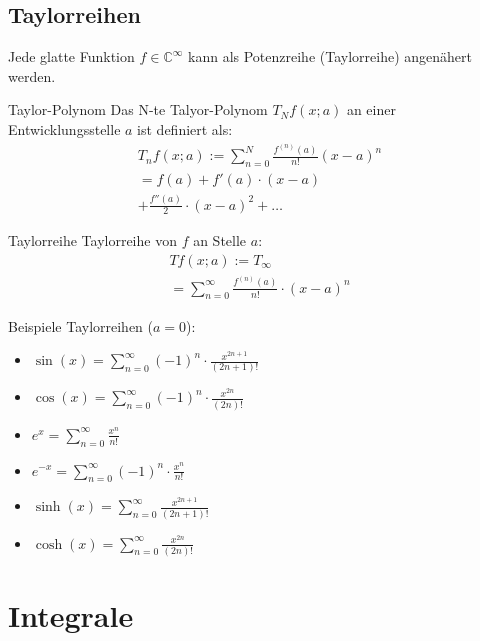 \documentclass[a4paper,10pt]{article}
\def\sumn{\sum_{n=0}^\infty}
\def\C{\mathbb{C}}
\begin{document}
\subsection{Taylorreihen}
Jede glatte Funktion $f \in \C^\infty$ kann als Potenzreihe (Taylorreihe) angenähert werden.

\begin{subbox}{Taylor-Polynom}
 Das N-te Talyor-Polynom $T_N f(x; a)$ an einer Entwicklungsstelle $a$ ist definiert als:
 \begin{multline*}
    T_n f(x; a) := \sum_{n=0}^{N} \frac{f^{(n)} (a)}{n!} (x - a)^n \\
    = f(a) + f'(a) \cdot (x-a) \\
    + \frac{f''(a)}{2} \cdot (x - a)^2 + \ldots
 \end{multline*}
\end{subbox}

\begin{mainbox}{Taylorreihe}
 Taylorreihe von $f$ an Stelle $a$:
 \begin{multline*}
     Tf(x;a) := T_\infty \\
     = \sumn \frac{f^{(n)}(a)}{n!} \cdot (x-a)^n
 \end{multline*}
\end{mainbox}
Beispiele Taylorreihen ($a = 0$):
\begin{itemize}
 \item $\sin(x) = \sumn (-1)^n \cdot \frac{x^{2n+1}}{(2n+1)!}$
 \item $\cos(x) = \sumn (-1)^n \cdot \frac{x^{2n}}{(2n)!}$
 \item $e^x = \sumn \frac{x^n}{n!}$
 \item $e^{-x} = \sumn (-1)^n \cdot \frac{x^n}{n!}$
 \item $\sinh(x) = \sumn \frac{x^{2n+1}}{(2n+1)!}$
 \item $\cosh(x) = \sumn \frac{x^{2n}}{(2n)!}$
\end{itemize}

\section{Integrale}
\end{document}
